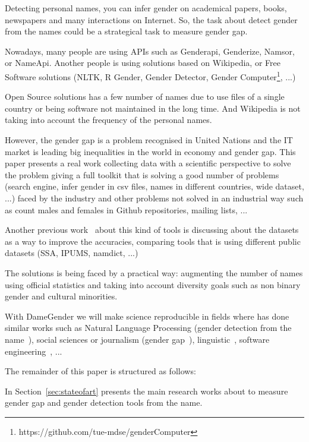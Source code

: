 \documentclass[a4paper]{article}
\begin{document}
Detecting personal names, you can infer gender on academical papers,
books, newspapers and many interactions on Internet. So, the task
about detect gender from the names could be a strategical task to
measure gender gap.

Nowadays, many people are using APIs such as Genderapi, Genderize,
Namsor, or NameApi. Another people is using solutions based on
Wikipedia, or Free Software solutions (NLTK\cite{loper2002nltk}, R
Gender, Gender Detector, Gender
Computer\footnote{https://github.com/tue-mdse/genderComputer}, ...)

Open Source solutions has a few number of names due to use files of a
single country or being software not maintained in the long time. And
Wikipedia is not taking into account the frequency of the personal
names.

However, the gender gap is a problem recognised in United Nations and
the IT market is leading big inequalities in the world in economy and
gender gap. This paper presents a real work collecting data with a
scientific perspective to solve the problem giving a full toolkit that
is solving a good number of problems (search engine, infer gender in
csv files, names in different countries, wide dataset, ...) faced by
the industry and other problems not solved in an industrial way such
as count males and females in Github repositories, mailing lists, ...

Another previous work~\cite{karimi2016inferring} about this kind of
tools is discussing about the datasets as a way to improve the
accuracies, comparing tools that is using different public datasets
(SSA, IPUMS, namdict, ...)

The solutions is being faced by a practical way: augmenting the number
of names using official statistics and taking into account diversity
goals such as non binary gender and cultural minorities.

With DameGender we will make science
reproducible\cite{peng2011reproducible} in fields where has done
similar works such as Natural Language Processing (gender detection
from the name~\cite{sun2019mitigating}), social sciences or journalism
(gender
gap~\cite{holman2018gender,mislove2011understanding,niemi2017gendered,de2014genero}),
linguistic~\cite{hutson2016gender,van2020gender,okal2018linguistic},
software engineering~\cite{vasilescu2012gender}, ...

The remainder of this paper is structured as follows:

In Section~\ref{sec:stateofart} presents the main research works about
to measure gender gap and gender detection tools from the name.
\end{document}
